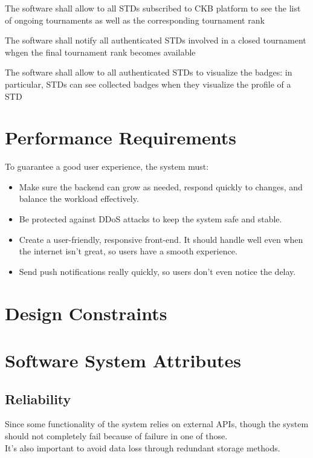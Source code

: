 \begin{requirementsenumerate}
        \item The software shall allow to all STDs subscribed to CKB platform to see the list of ongoing tournaments as well as the corresponding tournament rank  
        \item The software shall notify all authenticated STDs involved in a closed tournament whgen the final tournament rank becomes available
        \item The software shall allow to all authenticated STDs to visualize the badges: in particular, STDs can see collected badges when they visualize the profile of a STD
\end{requirementsenumerate}


\section{Performance Requirements}
To guarantee a good user experience, the system must:

\begin{itemize}
    \item Make sure the backend can grow as needed, respond quickly to changes, and balance the workload effectively.
    \item Be protected against DDoS attacks to keep the system safe and stable.
    \item Create a user-friendly, responsive front-end. It should handle well even when the internet isn't great, so users have a smooth experience.
    \item Send push notifications really quickly, so users don't even notice the delay.
\end{itemize}

{\color{red}\section{Design Constraints}}

\section{Software System Attributes}
\subsection{Reliability}
Since some functionality of the system relies on external APIs, though the system should not completely fail because of failure in one of those.\\
It's also important to avoid data loss through redundant storage methods.

